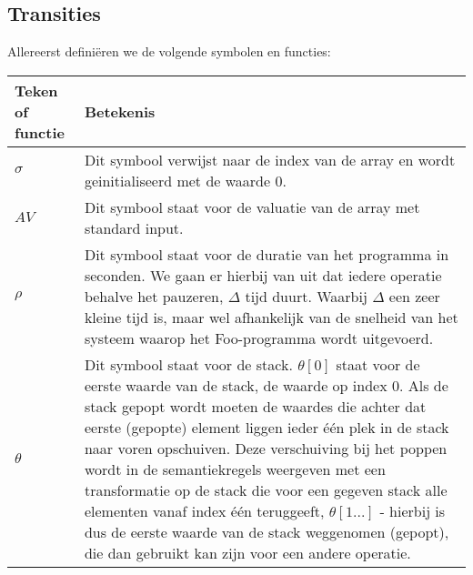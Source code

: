 \documentclass[11pt]{article}
\begin{document}
\subsection{Transities}
Allereerst defini\"eren we de volgende symbolen en functies:
\newline
\newline
\begin{tabular}{ | l | p{12cm} |}
    \hline
    Teken of functie & Betekenis \\ \hline
    \begin{math} \sigma \end{math} &  Dit symbool verwijst naar de index van de array en wordt geinitialiseerd met de waarde 0. \\ \hline
    \begin{math} AV \end{math} & Dit symbool staat voor de valuatie van de array met standard input. \\ \hline
    \begin{math} \rho \end{math} &  Dit symbool staat voor de duratie van het programma in seconden. We gaan er hierbij van uit dat iedere operatie behalve het pauzeren, \begin{math}\Delta\end{math} tijd duurt. Waarbij \begin{math}\Delta\end{math} een zeer kleine tijd is, maar wel afhankelijk van de snelheid van het systeem waarop het Foo-programma wordt uitgevoerd.  \\ \hline
    \begin{math} \theta \end{math} & Dit symbool staat voor de stack. \begin{math}\theta[0]\end{math} staat voor de eerste waarde van de stack, de waarde op index 0. Als de stack gepopt wordt moeten de waardes die achter dat eerste (gepopte) element liggen ieder \'e\'en plek in de stack naar voren opschuiven. Deze verschuiving bij het poppen wordt in de semantiekregels weergeven met een transformatie op de stack die voor een gegeven stack alle elementen vanaf index \'e\'en teruggeeft, \begin{math}\theta[1...]\end{math} - hierbij is dus de eerste waarde van de stack weggenomen (gepopt), die dan gebruikt kan zijn voor een andere operatie. \\ \hline

\end{tabular}
\end{document}
